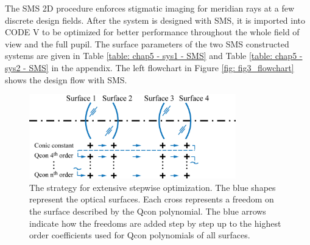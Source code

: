 The SMS 2D procedure enforces stigmatic imaging for meridian rays at a few discrete design fields. After the system is designed with SMS, it is imported into CODE V to be optimized for better performance throughout the whole field of view and the full pupil. The surface parameters of the two SMS constructed systems are given in Table \ref{table: chap5 - sys1 - SMS} and Table \ref{table: chap5 - sys2 - SMS} in the appendix. The left flowchart in Figure \ref{fig: fig3_flowchart} shows the design flow with SMS. 

\begin{figure}[h!]
    \centering
    \includegraphics[width=0.8\textwidth]{chapter-5/figures/Figure4_stepwise.png}
    \caption{The strategy for extensive stepwise optimization. The blue shapes represent the optical surfaces. Each cross represents a freedom on the surface described by the Qcon polynomial. The blue arrows indicate how the freedoms are added step by step up to the highest order coefficients used for Qcon polynomials of all surfaces. }
    \label{fig: fig4_stepwiseflow}
\end{figure}


